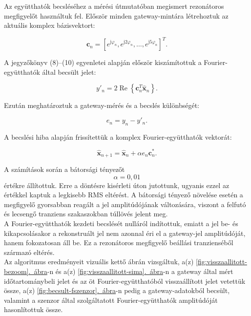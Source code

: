 \documentclass[12pt,a4paper]{article}
\newcommand{\abrara}[1]{\hyperref[#1]{\ref*{#1}.~ábra}}
\begin{document}
Az együtthatók becsléséhez a mérési útmutatóban megismert rezonátoros megfigyelőt használtuk fel. Először minden gateway-mintára létrehoztuk az aktuális komplex bázisvektort:

\begin{equation}
\boldsymbol{c}_n
=
\left[
e^{\mathrm{j}\varphi_n},
e^{\mathrm{j}2\varphi_n},
\ldots,
e^{\mathrm{j}5\varphi_n}
\right]^T.
\end{equation}

A jegyzőkönyv (8)--(10) egyenletei alapján először kiszámítottuk a
Fourier-együtthatók által becsült jelet:

\begin{equation}
y'_n
=
2\operatorname{Re}
\left\{
\boldsymbol{c}_n^T\hat{\boldsymbol{x}}_n
\right\}.
\end{equation}

Ezután meghatároztuk a gateway-mérés és a becslés különbségét:

\begin{equation}
e_n=y_n-y'_n.
\end{equation}

A becslési hiba alapján frissítettük a komplex Fourier-együtthatók
vektorát:

\begin{equation}
\hat{\boldsymbol{x}}_{n+1}
=
\hat{\boldsymbol{x}}_n
+\alpha e_n\boldsymbol{c}_n^*.
\end{equation}

A számítások során a bátorsági tényezőt
\begin{equation}
\alpha=0{,}01
\end{equation}
értékre állítottuk. Erre a döntésre kisérleti úton jutottunk, ugyanis ezzel az értékkel kaptuk a legkisebb RMS eltérést. A bátorsági tényező növelése esetén a megfigyelő gyorsabban reagált a jel amplitúdójának változására, viszont a felfutó és lecsengő tranziens szakaszokban túllövés jelent meg.\\

A Fourier-együtthatók kezdeti becslését nulláról indítottuk, emiatt a jel
be- és kikapcsolásakor a rekonstruált jel nem azonnal éri el a gateway-jel
amplitúdóját, hanem fokozatosan áll be. Ez a rezonátoros megfigyelő beállási tranzienséből
származó eltérés.\\

Az algoritmus eredményeit vizuális kettő ábrán vizsgáltuk, a(z) \abrara{fig:visszaallitott-bezoom}-n és a(z) \abrara{fig:visszaallitott-sima}-n a gateway által mért időtartománybeli jelet és az öt Fourier-együtthatóból visszaállított jelet vetettük össze, a(z) \abrara{fig:becsult-fszenzor}-n pedig a gateway-adatokból becsült, valamint a szenzor által szolgáltatott Fourier-együtthatók amplitúdóját hasonlítottuk össze.\\
\end{document}
